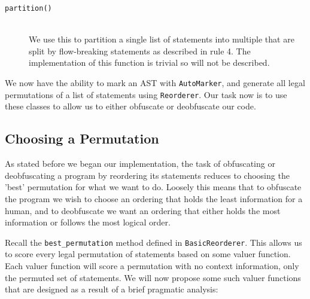 \documentclass[twoside,a4paper]{report}
\begin{document}
\begin{description}
\item[\texttt{partition()}] \hfill \\
We use this to partition a single list of statements into multiple that are split by flow-breaking statements as described in rule 4. The implementation of this
function is trivial so will not be described.
\end{description}

We now have the ability to mark an AST with \texttt{AutoMarker}, and generate all legal permutations of a list of statements using \texttt{Reorderer}. Our task
now is to use these classes to allow us to either obfuscate or deobfuscate our code.

\subsection{Choosing a Permutation}

As stated before we began our implementation, the task of obfuscating or deobfuscating a program by reordering its statements reduces to choosing the 'best'
permutation for what we want to do. Loosely this means that to obfuscate the program we wish to choose an ordering that holds the least information for a
human, and to deobfuscate we want an ordering that either holds the most information or follows the most logical order.

Recall the \texttt{best\_permutation} method defined in \texttt{BasicReorderer}. This allows us to score every legal permutation of statements based on some
valuer function. Each valuer function will score a permutation with no context information, only the permuted set of statements. We will now propose some
such valuer functions that are designed as a result of a brief pragmatic analysis:
\end{document}
